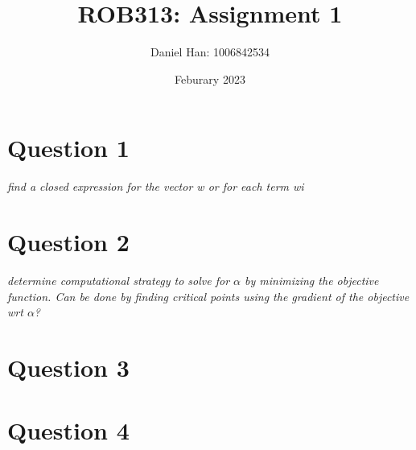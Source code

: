 \documentclass{article}
\title{ROB313: Assignment 1}
\author{Daniel Han: 1006842534}
\date{Feburary 2023}
\begin{document}
\maketitle

\section*{Question 1}
\textit{find a closed expression for the vector w or for each term wi}

\section*{Question 2}
\textit{determine computational strategy to solve for $\alpha$ by minimizing the objective function. Can be done by finding critical points using the gradient of the objective wrt $\alpha$?}

\section*{Question 3}

\section*{Question 4}
\end{document}
